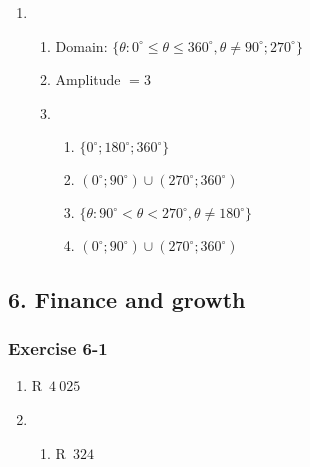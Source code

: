 {\begin{multicols}{3}
\begin{enumerate}[noitemsep, label=\textbf{\arabic*}. ]
\item %
    \begin{enumerate}[noitemsep, label=\textbf{(\alph*)} ]
    \item Domain: $\{\theta: 0^{\circ}\leq\theta\leq 360^{\circ}, \theta \ne 90^{\circ}; 270^{\circ}\}$%
    \item Amplitude $=3$%
    \item %
      \begin{enumerate}[noitemsep, label=\textbf{\roman*}. ]
	    \item $\{0^{\circ};180^{\circ};360^{\circ}\}$%
	    \item $(0^{\circ};90^{\circ})\cup (270^{\circ};360^{\circ})$%
	    \item $\{\theta: 90^{\circ}<\theta<270^{\circ}, \theta \ne 180^{\circ}\}$%
	    \item $(0^{\circ};90^{\circ})\cup (270^{\circ};360^{\circ})$%
  \end{enumerate}

  \end{enumerate}
\end{enumerate}

\end{multicols}


\subsection* {6. Finance and growth}
\begin{multicols}{3}
\subsubsection*{Exercise 6-1} %

    \begin{enumerate}[noitemsep, label=\textbf{\arabic*}.]
	\item R~$4~025$%

	\item %
	\begin{enumerate}[noitemsep, label=\textbf{(\alph*)} ]
	    \item R~$324$%


\end{enumerate}
\end{enumerate}
\end{multicols}}
